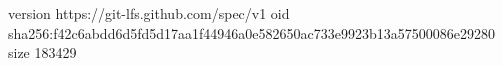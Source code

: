 version https://git-lfs.github.com/spec/v1
oid sha256:f42c6abdd6d5fd5d17aa1f44946a0e582650ac733e9923b13a57500086e29280
size 183429
